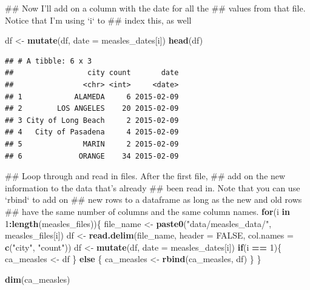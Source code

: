 \documentclass[]{book}
\makeatletter
\newenvironment{Shaded}{\begin{snugshade}}{\end{snugshade}}
\newcommand{\KeywordTok}[1]{\textcolor[rgb]{0.13,0.29,0.53}{\textbf{#1}}}
\newcommand{\DataTypeTok}[1]{\textcolor[rgb]{0.13,0.29,0.53}{#1}}
\newcommand{\DecValTok}[1]{\textcolor[rgb]{0.00,0.00,0.81}{#1}}
\newcommand{\StringTok}[1]{\textcolor[rgb]{0.31,0.60,0.02}{#1}}
\newcommand{\OtherTok}[1]{\textcolor[rgb]{0.56,0.35,0.01}{#1}}
\newcommand{\ControlFlowTok}[1]{\textcolor[rgb]{0.13,0.29,0.53}{\textbf{#1}}}
\newcommand{\OperatorTok}[1]{\textcolor[rgb]{0.81,0.36,0.00}{\textbf{#1}}}
\newcommand{\NormalTok}[1]{#1}
\newenvironment{kframe}{%
\medskip{}
\setlength{\fboxsep}{.8em}
 \def\at@end@of@kframe{}%
 \ifinner\ifhmode%
  \def\at@end@of@kframe{\end{minipage}}%
  \begin{minipage}{\columnwidth}%
 \fi\fi%
 \def\FrameCommand##1{\hskip\@totalleftmargin \hskip-\fboxsep
 \colorbox{shadecolor}{##1}\hskip-\fboxsep
     \hskip-\linewidth \hskip-\@totalleftmargin \hskip\columnwidth}%
 \MakeFramed {\advance\hsize-\width
   \@totalleftmargin\z@ \linewidth\hsize
   \@setminipage}}%
 {\par\unskip\endMakeFramed%
 \at@end@of@kframe}
\renewenvironment{Shaded}{\begin{kframe}}{\end{kframe}}
\theoremstyle{definition}
\theoremstyle{definition}
\theoremstyle{definition}
\theoremstyle{remark}
\makeatother
\begin{document}
\begin{Shaded}
\begin{Highlighting}[]
\NormalTok{## Now I'll add on a column with the date for all the }
\NormalTok{## values from that file. Notice that I'm using `i` to }
\NormalTok{## index this, as well}

\NormalTok{df <-}\StringTok{ }\KeywordTok{mutate}\NormalTok{(df, }\DataTypeTok{date =}\NormalTok{ measles_dates[i])}
\KeywordTok{head}\NormalTok{(df)}
\end{Highlighting}
\end{Shaded}

\begin{verbatim}
## # A tibble: 6 x 3
##                 city count       date
##                <chr> <int>     <date>
## 1            ALAMEDA     6 2015-02-09
## 2        LOS ANGELES    20 2015-02-09
## 3 City of Long Beach     2 2015-02-09
## 4   City of Pasadena     4 2015-02-09
## 5              MARIN     2 2015-02-09
## 6             ORANGE    34 2015-02-09
\end{verbatim}

\begin{Shaded}
\begin{Highlighting}[]
\NormalTok{## Loop through and read in files. After the first file,}
\NormalTok{## add on the new information to the data that's already }
\NormalTok{## been read in. Note that you can use `rbind` to add on }
\NormalTok{## new rows to a dataframe as long as the new and old rows}
\NormalTok{## have the same number of columns and the same column names.}
\ControlFlowTok{for}\NormalTok{(i }\ControlFlowTok{in} \DecValTok{1}\OperatorTok{:}\KeywordTok{length}\NormalTok{(measles_files))\{}
\NormalTok{        file_name <-}\StringTok{ }\KeywordTok{paste0}\NormalTok{(}\StringTok{"data/measles_data/"}\NormalTok{, measles_files[i])}
\NormalTok{        df <-}\StringTok{ }\KeywordTok{read.delim}\NormalTok{(file_name, }\DataTypeTok{header =} \OtherTok{FALSE}\NormalTok{, }
                         \DataTypeTok{col.names =} \KeywordTok{c}\NormalTok{(}\StringTok{"city"}\NormalTok{, }\StringTok{"count"}\NormalTok{))}
\NormalTok{        df <-}\StringTok{ }\KeywordTok{mutate}\NormalTok{(df, }\DataTypeTok{date =}\NormalTok{ measles_dates[i])}
        \ControlFlowTok{if}\NormalTok{(i }\OperatorTok{==}\StringTok{ }\DecValTok{1}\NormalTok{)\{}
\NormalTok{                ca_measles <-}\StringTok{ }\NormalTok{df}
\NormalTok{        \} }\ControlFlowTok{else}\NormalTok{ \{ }
\NormalTok{                 ca_measles <-}\StringTok{ }\KeywordTok{rbind}\NormalTok{(ca_measles, df)}
\NormalTok{                \}}
\NormalTok{\}}

\KeywordTok{dim}\NormalTok{(ca_measles)}
\end{Highlighting}
\end{Shaded}
\end{document}
